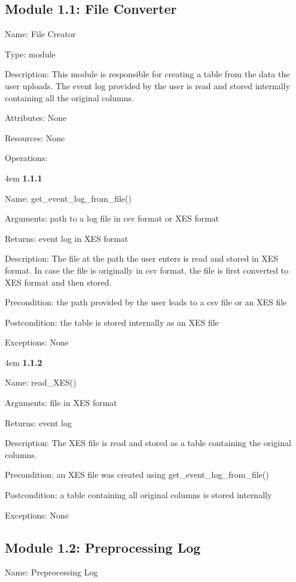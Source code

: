 \documentclass[notitlepage]{article}
\begin{document}
\begin{flushleft}
\subsection{Module 1.1: File Converter}
Name: File Creator

Type: module

Description: This module is responsible for creating a table from the data the user uploads. The event log provided by the user is read and stored internally containing all the original columns. 

Attributes: None

Resources: None

Operations: 
\medskip

\par
\begingroup
\leftskip4em
\textbf{1.1.1}

Name: get\_event\_log\_from\_file()

Arguments: path to a log file in csv format or XES format

Returns: event log in XES format

Description: The file at the path the user enters is read and stored in XES format. In case the file is originally in csv format, the file is first converted to XES format and then stored.

Precondition: the path provided by the user leads to a csv file or an XES file

Postcondition: the table is stored internally as an XES file

Exceptions: None
\par
\endgroup

\medskip

\par
\begingroup
\leftskip4em
\textbf{1.1.2}

Name: read\_XES()

Arguments: file in XES format

Returns: event log 

Description: The XES file is read and stored as a table containing the original columns.

Precondition: an XES file was created using get\_event\_log\_from\_file()

Postcondition: a table containing all original columns is stored internally 

Exceptions: None
\par
\endgroup

\medskip

\subsection{Module 1.2: Preprocessing Log}
Name: Preprocessing Log


\end{flushleft}
\end{document}
